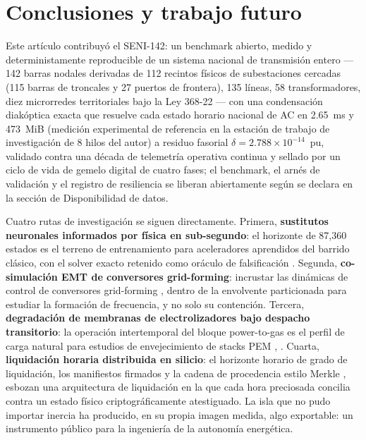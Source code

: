 \section{Conclusiones y trabajo futuro}
\label{sec:conclusion}

Este artículo contribuyó el SENI-142: un benchmark abierto, medido y deterministamente reproducible de un sistema nacional de transmisión entero --- 142 barras nodales derivadas de 112 recintos físicos de subestaciones cercadas (115 barras de troncales y 27 puertos de frontera), 135 líneas, 58 transformadores, diez microrredes territoriales bajo la Ley 368-22 --- con una condensación diakóptica exacta que resuelve cada estado horario nacional de AC en 2.65~ms y 473~MiB (medición experimental de referencia en la estación de trabajo de investigación de 8 hilos del autor) a residuo fasorial $\delta = 2.788 \times 10^{-14}$~pu, validado contra una década de telemetría operativa continua y sellado por un ciclo de vida de gemelo digital de cuatro fases; el benchmark, el arnés de validación y el registro de resiliencia se liberan abiertamente según se declara en la sección de Disponibilidad de datos.

Cuatro rutas de investigación se siguen directamente. Primera, \textbf{sustitutos neuronales informados por física en sub-segundo}: el horizonte de 87,360 estados es el terreno de entrenamiento para aceleradores aprendidos del barrido clásico, con el solver exacto retenido como oráculo de falsificación \cite{misyris2020}. Segunda, \textbf{co-simulación EMT de conversores grid-forming}: incrustar las dinámicas de control de conversores grid-forming \cite{rosso2021}, \cite{ieee2800} dentro de la envolvente particionada para estudiar la formación de frecuencia, y no solo su contención. Tercera, \textbf{degradación de membranas de electrolizadores bajo despacho transitorio}: la operación intertemporal del bloque power-to-gas es el perfil de carga natural para estudios de envejecimiento de stacks PEM \cite{irena2020}, \cite{iea2023}. Cuarta, \textbf{liquidación horaria distribuida en silicio}: el horizonte horario de grado de liquidación, los manifiestos firmados y la cadena de procedencia estilo Merkle \cite{merkle1987}, \cite{fips180} esbozan una arquitectura de liquidación en la que cada hora preciosada concilia contra un estado físico criptográficamente atestiguado. La isla que no pudo importar inercia ha producido, en su propia imagen medida, algo exportable: un instrumento público para la ingeniería de la autonomía energética.

